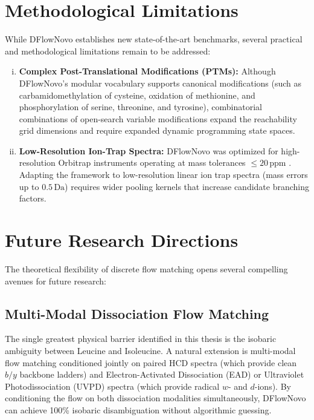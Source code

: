 \section{Methodological Limitations}

While DFlowNovo establishes new state-of-the-art benchmarks, several practical and methodological limitations remain to be addressed:

\begin{enumerate}[(i)]
\item \textbf{Complex Post-Translational Modifications (PTMs):} Although DFlowNovo's modular vocabulary supports canonical modifications (such as carbamidomethylation of cysteine, oxidation of methionine, and phosphorylation of serine, threonine, and tyrosine), combinatorial combinations of open-search variable modifications expand the reachability grid dimensions and require expanded dynamic programming state spaces.
\item \textbf{Low-Resolution Ion-Trap Spectra:} DFlowNovo was optimized for high-resolution Orbitrap instruments operating at mass tolerances $\le 20\,\text{ppm}$ \citep{Makarov2000, Zubarev2007}. Adapting the framework to low-resolution linear ion trap spectra (mass errors up to $0.5\,\text{Da}$) requires wider pooling kernels that increase candidate branching factors.
\end{enumerate}

\section{Future Research Directions}

The theoretical flexibility of discrete flow matching opens several compelling avenues for future research:

\subsection{Multi-Modal Dissociation Flow Matching}
The single greatest physical barrier identified in this thesis is the isobaric ambiguity between Leucine and Isoleucine. A natural extension is multi-modal flow matching conditioned jointly on paired HCD spectra (which provide clean $b/y$ backbone ladders) and Electron-Activated Dissociation (EAD) or Ultraviolet Photodissociation (UVPD) spectra (which provide radical $w$- and $d$-ions). By conditioning the flow on both dissociation modalities simultaneously, DFlowNovo can achieve 100\% isobaric disambiguation without algorithmic guessing.

